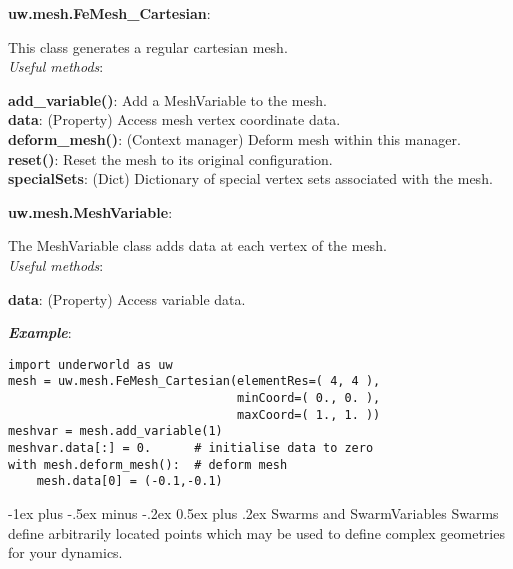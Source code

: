 \documentclass[10pt,landscape]{article}
\makeatletter
\renewcommand{\section}{\@startsection{section}{1}{0mm}%
                                {-1ex plus -.5ex minus -.2ex}%
                                {0.5ex plus .2ex}%
                                {\normalfont\large\bfseries}}
\makeatother
\begin{document}
\begin{multicols}{2}
\noindent\textbf{uw.mesh.FeMesh\_Cartesian}:
\begin{addmargin}[1em]{2em}
This class generates a regular cartesian mesh.\\
\vspace{1mm}
\textit{Useful methods}:\\
\begin{addmargin}[1em]{2em}
\textbf{add\_variable()}: Add a MeshVariable to the mesh.\\
\textbf{data}: (Property) Access mesh vertex coordinate data.\\
\textbf{deform\_mesh()}: (Context manager) Deform mesh within this manager.\\
\textbf{reset()}: Reset the mesh to its original configuration.\\
\textbf{specialSets}: (Dict) Dictionary of special vertex sets associated with the mesh.\\
\end{addmargin}
\end{addmargin}

\vspace{1mm}

\noindent\textbf{uw.mesh.MeshVariable}:
\begin{addmargin}[1em]{2em}
The MeshVariable class adds data at each vertex of the mesh.\\
\vspace{1mm}
\textit{Useful methods}:\\
\begin{addmargin}[1em]{2em}
\textbf{data}: (Property) Access variable data.\\
\end{addmargin}
\end{addmargin}

\vspace{2mm}
\noindent\textbf{\textit{Example}}:
\begin{lstlisting}
import underworld as uw
mesh = uw.mesh.FeMesh_Cartesian(elementRes=( 4, 4 ),
                                minCoord=( 0., 0. ),
                                maxCoord=( 1., 1. ))
meshvar = mesh.add_variable(1)
meshvar.data[:] = 0.      # initialise data to zero
with mesh.deform_mesh():  # deform mesh
    mesh.data[0] = (-0.1,-0.1)
\end{lstlisting}

\section{Swarms and SwarmVariables}
Swarms define arbitrarily located points which may be used to define complex
geometries for your dynamics.
\newline


\end{multicols}
\end{document}
